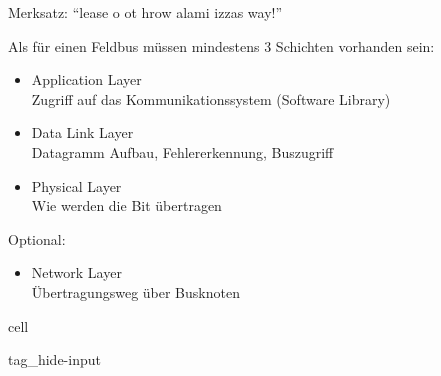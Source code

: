 \documentclass[letterpaper,10pt,english]{jupyterBook}
\begin{document}
\sphinxAtStartPar
{}

\sphinxAtStartPar
Merksatz: “lease o ot hrow alami izzas way!”

\sphinxAtStartPar
Als für einen Feldbus müssen mindestens 3 Schichten vorhanden sein:
\begin{itemize}
\item {} 
\sphinxAtStartPar
Application Layer\\
Zugriff auf das Kommunikationssystem (Software Library)

\item {} 
\sphinxAtStartPar
Data Link Layer\\
Datagramm Aufbau, Fehlererkennung, Buszugriff

\item {} 
\sphinxAtStartPar
Physical Layer\\
Wie werden die Bit übertragen

\end{itemize}

\sphinxAtStartPar
Optional:
\begin{itemize}
\item {} 
\sphinxAtStartPar
Network Layer\\
Übertragungsweg über Busknoten

\end{itemize}

\begin{DUlineblock}{0em}
\item[] 
\end{DUlineblock}

\begin{sphinxuseclass}{cell}
\begin{sphinxuseclass}{tag_hide-input}
\end{sphinxuseclass}
\end{sphinxuseclass}
\begin{DUlineblock}{0em}
\item[] 
\end{DUlineblock}

\begin{DUlineblock}{0em}
\item[] 
\end{DUlineblock}
\end{document}
